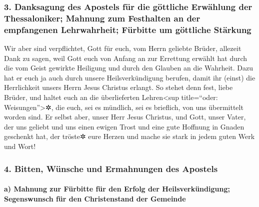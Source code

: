 \hypertarget{danksagung-des-apostels-fuxfcr-die-guxf6ttliche-erwuxe4hlung-der-thessaloniker-mahnung-zum-festhalten-an-der-empfangenen-lehrwahrheit-fuxfcrbitte-um-guxf6ttliche-stuxe4rkung}{%
\subsubsection{3. Danksagung des Apostels für die göttliche Erwählung
der Thessaloniker; Mahnung zum Festhalten an der empfangenen
Lehrwahrheit; Fürbitte um göttliche
Stärkung}\label{danksagung-des-apostels-fuxfcr-die-guxf6ttliche-erwuxe4hlung-der-thessaloniker-mahnung-zum-festhalten-an-der-empfangenen-lehrwahrheit-fuxfcrbitte-um-guxf6ttliche-stuxe4rkung}}

 Wir aber sind verpflichtet, Gott für euch, vom Herrn
geliebte Brüder, allezeit Dank zu sagen, weil Gott euch von Anfang an
zur Errettung erwählt hat durch die vom Geist gewirkte Heiligung und
durch den Glauben an die Wahrheit.  Dazu hat er euch ja
auch durch unsere Heilsverkündigung berufen, damit ihr (einst) die
Herrlichkeit unsers Herrn Jesus Christus erlangt.  So
stehet denn fest, liebe Brüder, und haltet euch an die überlieferten
Lehren\textless sup title=``oder: Weisungen''\textgreater✲, die euch,
sei es mündlich, sei es brieflich, von uns übermittelt worden sind.
 Er selbst aber, unser Herr Jesus Christus, und Gott,
unser Vater, der uns geliebt und uns einen ewigen Trost und eine gute
Hoffnung in Gnaden geschenkt hat,  der tröste✲ eure
Herzen und mache sie stark in jedem guten Werk und Wort!

\hypertarget{bitten-wuxfcnsche-und-ermahnungen-des-apostels}{%
\subsubsection{4. Bitten, Wünsche und Ermahnungen des
Apostels}\label{bitten-wuxfcnsche-und-ermahnungen-des-apostels}}

\hypertarget{a-mahnung-zur-fuxfcrbitte-fuxfcr-den-erfolg-der-heilsverkuxfcndigung-segenswunsch-fuxfcr-den-christenstand-der-gemeinde}{%
\paragraph{a) Mahnung zur Fürbitte für den Erfolg der Heilsverkündigung;
Segenswunsch für den Christenstand der
Gemeinde}\label{a-mahnung-zur-fuxfcrbitte-fuxfcr-den-erfolg-der-heilsverkuxfcndigung-segenswunsch-fuxfcr-den-christenstand-der-gemeinde}}

